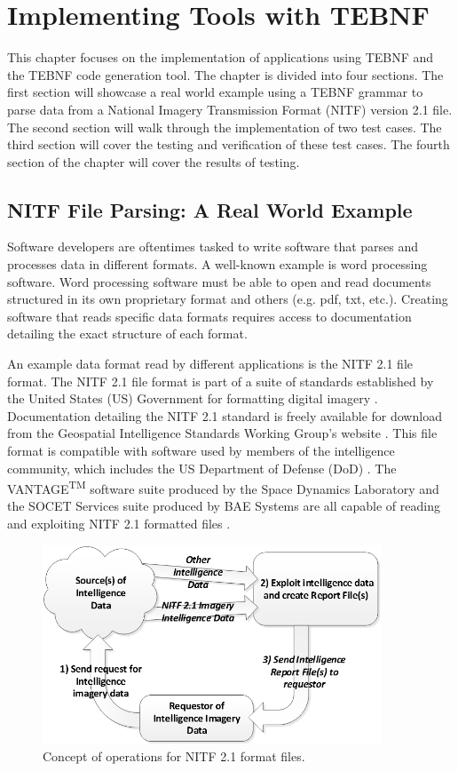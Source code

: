 \chapter{Implementing Tools with TEBNF}
This chapter focuses on the implementation of applications using TEBNF and the TEBNF code generation tool.  The chapter is divided into four sections.  The first section will showcase a real world example using a TEBNF grammar to parse data from a National Imagery Transmission Format (NITF) version 2.1 file.  The second section will walk through the implementation of two test cases.  The third section will cover the testing and verification of these test cases.  The fourth section of the chapter will cover the results of testing.

\section{NITF File Parsing: A Real World Example}
\label{sections:RealWorldNitfExample}
Software developers are oftentimes tasked to write software that parses and processes data in different formats.  A well-known example is word processing software.  Word processing software must be able to open and read documents structured in its own proprietary format and others (e.g. pdf, txt, etc.).  Creating software that reads specific data formats requires access to documentation detailing the exact structure of each format.

\indent
An example data format read by different applications is the NITF 2.1 file format.  The NITF 2.1 file format is part of a suite of standards established by the United States (US) Government for formatting digital imagery \cite{2500c_01}.  Documentation detailing the NITF 2.1 standard is freely available for download from the Geospatial Intelligence Standards Working Group’s website \cite{gwg_01}.  This file format is compatible with software used by members of the intelligence community, which includes the US Department of Defense (DoD) \cite{2500c_01}.  The VANTAGE\textsuperscript{TM} software suite produced by the Space Dynamics Laboratory and the SOCET Services suite produced by BAE Systems are all capable of reading and exploiting NITF 2.1 formatted files \cite{sdl_01,bae_01}.

\begin{figure}[htbp]
\centering
\includegraphics[width=0.9\textwidth]{figures/NitfConops.png}
\caption{Concept of operations for NITF 2.1 format files.}
\label{fig:NitfConops}
\end{figure}

